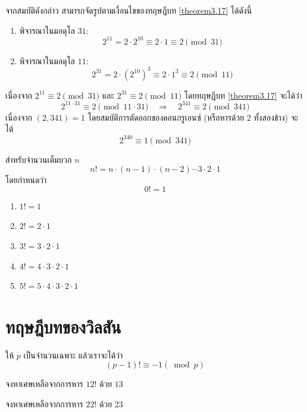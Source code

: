 จากสมบัติดังกล่าว สามารถจัดรูปตามเงื่อนไขของทฤษฎีบท \ref{theorem3.17} ได้ดังนี้
\begin{enumerate}
	\item พิจารณาในมอดุโล $31$:
	\[ 2^{11} = 2 \cdot 2^{10} \equiv 2 \cdot 1 \equiv 2 \pmod{31} \]
	\item พิจารณาในมอดุโล $11$:
	\[ 2^{31} = 2 \cdot (2^{10})^3 \equiv 2 \cdot 1^3 \equiv 2 \pmod{11} \]
\end{enumerate}
เนื่องจาก $2^{11} \equiv 2 \pmod{31}$ และ $2^{31} \equiv 2 \pmod{11}$ โดยทฤษฎีบท \ref{theorem3.17} จะได้ว่า
\[ 2^{11 \cdot 31} \equiv 2 \pmod{11 \cdot 31} \quad \Rightarrow \quad 2^{341} \equiv 2 \pmod{341} \]
เนื่องจาก $(2, 341) = 1$ โดยสมบัติการตัดออกของคอนกรูเอนซ์ (หรือหารด้วย $2$ ทั้งสองข้าง) จะได้
\[ 2^{340} \equiv 1 \pmod{341}\]

\newpage
\begin{definitionbox}[แฟกทอเรียล]
	สำหรับจำนวนเต็มบวก \(n\)
	\[
	n! = n \cdot (n-1) \cdot (n-2) \cdots 3 \cdot 2 \cdot 1
	\]
	โดยกำหนดว่า
	\[
	0! = 1
	\]    
\end{definitionbox}

\begin{examplebox}
	\begin{enumerate}
		\item $1! = 1$
		\item $2! =  2\cdot 1$
		\item $3! = 3\cdot 2\cdot 1$
		\item $4! = 4\cdot 3\cdot 2\cdot 1$
		\item $5! = 5\cdot 4\cdot 3\cdot 2\cdot 1$
	\end{enumerate}    
\end{examplebox}

\section{ทฤษฎีบทของวิลสัน}
\begin{theorembox}
	ให้ $p$ เป็นจำนวนเฉพาะ แล้วเราจะได้ว่า
	\[(p-1)!\equiv -1(\bmod p)\]
\end{theorembox}

\begin{examplebox}
	จงหาเศษเหลือจากการหาร $12!$ ด้วย $13$
\end{examplebox}
\solution


\newpage
\begin{examplebox}
	จงหาเศษเหลือจากการหาร $22!$ ด้วย $23$
\end{examplebox}
\solution
\newpage

